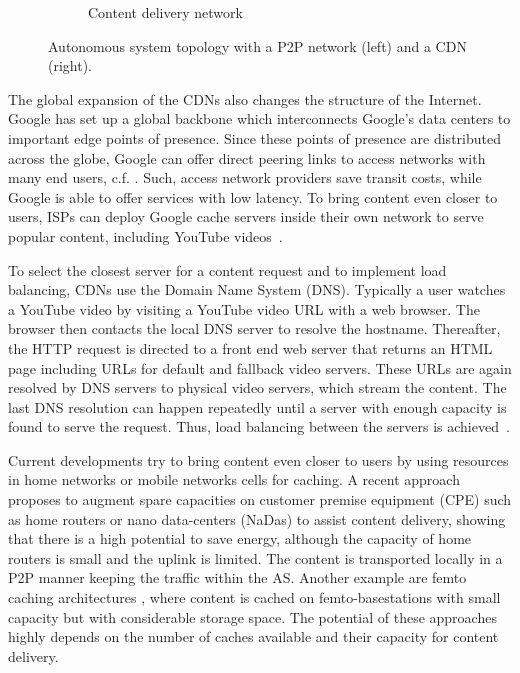 \begin{figure}[bt]
\begin{subfigure}[b]{0.54\textwidth}
    \vspace{-0.5cm}
    \caption{Content delivery network}
    \label{fig:aslevel:cdn}
	\end{subfigure}
\hspace{-0.5cm}
	\caption{Autonomous system topology with a P2P network (left) and a CDN (right).}\label{fig:aslevel:p2pcdn}
\end{figure}

The global expansion of the CDNs also changes the structure of the Internet.
Google has set up a global backbone which interconnects Google's data centers to important edge points of presence.
Since these points of presence are distributed across the globe, Google can offer direct peering links to access networks with many end users, c.f. .
Such, access network providers save transit costs, while Google is able to offer services with low latency.
To bring content even closer to users, ISPs can deploy Google cache servers inside their own network to serve popular content, including YouTube videos~\cite{gcc}.

To select the closest server for a content request and to implement load balancing, CDNs use the Domain Name System (DNS).
Typically a user watches a YouTube video by visiting a YouTube video URL with a web browser.
The browser then contacts the local DNS server to resolve the hostname.
Thereafter, the HTTP request is directed to a front end web server that returns an HTML page including URLs for default and fallback video servers.
These URLs are again resolved by DNS servers to physical video servers, which stream the content.
The last DNS resolution can happen repeatedly until a server with enough capacity is found to serve the request.
Thus, load balancing between the servers is achieved~\cite{adhikari2012vivisecting}.

Current developments try to bring content even closer to users by using resources in home networks or mobile networks cells for caching.
A recent approach \cite{valancius2009greening} proposes to augment spare capacities on customer premise equipment (CPE) such as home routers or nano data-centers (NaDas) to assist content delivery, showing that there is a high potential to save energy, although the capacity of home routers is small and the uplink is limited.
The content is transported locally in a P2P manner keeping the traffic within the AS.
Another example are femto caching architectures \cite{golrezaei2013femtocaching}, where content is cached on femto-basestations with small capacity but with considerable storage space.
The potential of these approaches highly depends on the number of caches available and their capacity for content delivery.

